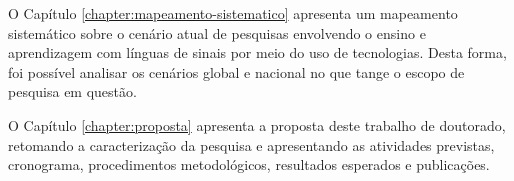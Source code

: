 O Capítulo \ref{chapter:mapeamento-sistematico} apresenta um mapeamento sistemático sobre o cenário atual de pesquisas envolvendo o ensino e aprendizagem com línguas de sinais por meio do uso de tecnologias. Desta forma, foi possível analisar os cenários global e nacional no que tange o escopo de pesquisa em questão.

O Capítulo \ref{chapter:proposta} apresenta a proposta deste trabalho de doutorado, retomando a caracterização da pesquisa e apresentando as atividades previstas, cronograma, procedimentos metodológicos, resultados esperados e publicações. 